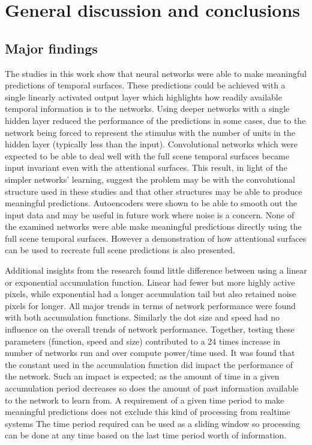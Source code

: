 \chapter{General discussion and conclusions}

\section{Major findings}
The studies in this work show that neural networks were able to make meaningful predictions of temporal surfaces.
These predictions could be achieved with a single linearly activated output layer which highlights how readily available temporal information is to the networks.
Using deeper networks with a single hidden layer reduced the performance of the predictions in some cases, due to the network being forced to represent the stimulus with the number of units in the hidden layer (typically less than the input). 
Convolutional networks which were expected to be able to deal well with the full scene temporal surfaces became input invariant even with the attentional surfaces.
This result, in light of the simpler networks' learning, suggest the problem may be with the convolutional structure used in these studies and that other structures may be able to produce meaningful predictions.
Autoencoders were shown to be able to smooth out the input data and may be useful in future work where noise is a concern. 
None of the examined networks were able make meaningful predictions directly using the full scene temporal surfaces.
However a demonstration of how attentional surfaces can be used to recreate full scene predictions is also presented. 

Additional insights from the research found little difference between using a linear or exponential accumulation function. 
Linear had fewer but more highly active pixels, while exponential had a longer accumulation tail but also retained noise pixels for longer.
All major trends in terms of network performance were found with both accumulation functions.
Similarly the dot size and speed had no influence on the overall trends of network performance. 
Together, testing these parameters (function, speed and size) contributed to a 24 times increase in number of networks run and over compute power/time used. 
It was found that the constant used in the accumulation function did impact the performance of the network.
Such an impact is expected; as the amount of time in a given accumulation period decreases so does the amount of past information available to the network to learn from. 
A requirement of a given time period to make meaningful predictions does not exclude this kind of processing from realtime systems 
The time period required can be used as a sliding window so processing can be done at any time based on the last time period worth of information. 

